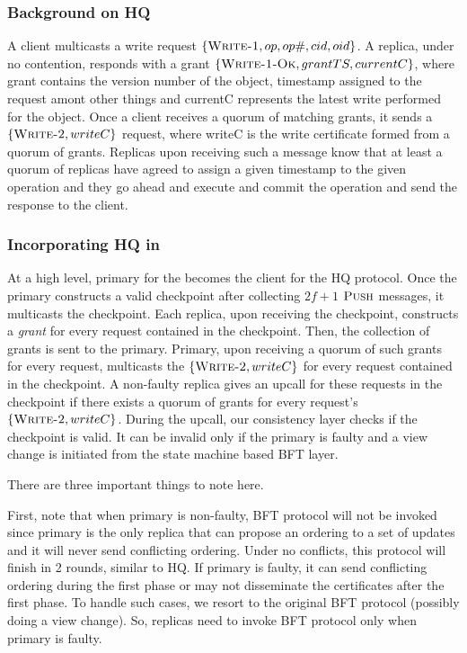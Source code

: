 \documentclass[twocolumn,10pt]{article}
\begin{document}
{\subsubsection{Background on HQ}
A client multicasts a write request $\{\textsc{Write-1}, op, op\#, cid, oid\}$. A
replica, under no contention, responds with a grant $\{\textsc{Write-1-Ok}, grantTS, currentC\}$,
where grant contains the version number of the object, timestamp assigned to the request
amont other things and currentC represents the latest write performed for the object. 
Once a client receives a quorum of matching grants, it sends a
$\{\textsc{Write-2}, writeC\}$ request, where writeC is the write certificate formed from
a quorum of grants. Replicas upon receiving such a message know that at least a quorum
of replicas have agreed to assign a given timestamp to the given operation and they go
ahead and execute and commit the operation and send the response to the client.

\subsubsection{Incorporating HQ in \Sys}
At a high level, primary for the \Sys becomes the client for the HQ protocol. 
Once the primary constructs a valid checkpoint after collecting $2f+1$ $\textsc{Push}$
messages, it multicasts the checkpoint. Each replica, upon receiving the checkpoint,
constructs a \emph{grant} for every request contained in the checkpoint. Then, the collection
of grants is sent to the primary. Primary, upon receiving a quorum of such grants for every request, multicasts
the $\{\textsc{Write-2}, writeC\}$ for every request contained in the checkpoint.
A non-faulty replica gives an upcall for these requests in the checkpoint if there 
exists a quorum of grants for every request's $\{\textsc{Write-2}, writeC\}$. During the upcall,
our consistency layer checks if the checkpoint is valid. It can be invalid only if the primary
is faulty and a view change is initiated from the state machine based BFT layer. 



There are three important things to note here.

First, note that when primary is non-faulty, BFT protocol will not
be invoked since primary is the only replica that can propose an ordering to a 
set of updates and it will never send conflicting ordering. Under no conflicts,
this protocol will finish in 2 rounds, similar to HQ. If 
primary is faulty, it can send conflicting ordering during the first phase or 
may not disseminate the certificates after the first phase. To handle such cases, we resort to the 
original BFT protocol (possibly doing a view change). So, replicas need to invoke
BFT protocol only when primary is faulty.

}
\end{document}

